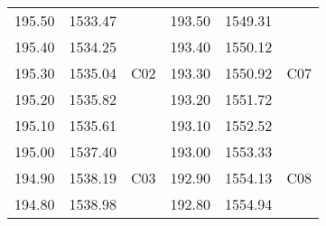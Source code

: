 \documentclass[
	12pt, %
	fleqn, %
	a4paper, %
	oneside, %
]{LegrandOrangeBook}
\begin{document}
\begin{table}[H]
{\begin{tabular}{|ccc|ccc|}
\multicolumn{1}{|c|}{195.50}                                   & \multicolumn{1}{c|}{1533.47}                                 &                       & \multicolumn{1}{c|}{193.50}                                   & \multicolumn{1}{c|}{1549.31}                                 &                       \\ \cline{1-2} \cline{4-5}
\multicolumn{1}{|c|}{195.40}                                   & \multicolumn{1}{c|}{1534.25}                                 &                       & \multicolumn{1}{c|}{193.40}                                   & \multicolumn{1}{c|}{1550.12}                                 &                       \\ \cline{1-2} \cline{4-5}
\multicolumn{1}{|c|}{195.30}                                   & \multicolumn{1}{c|}{1535.04}                                 & \multirow{-4}{*}{C02} & \multicolumn{1}{c|}{193.30}                                   & \multicolumn{1}{c|}{1550.92}                                 & \multirow{-4}{*}{C07} \\ \hline
\multicolumn{1}{|c|}{195.20}                                   & \multicolumn{1}{c|}{1535.82}                                 &                       & \multicolumn{1}{c|}{193.20}                                   & \multicolumn{1}{c|}{1551.72}                                 &                       \\ \cline{1-2} \cline{4-5}
\multicolumn{1}{|c|}{195.10}                                   & \multicolumn{1}{c|}{1535.61}                                 &                       & \multicolumn{1}{c|}{193.10}                                   & \multicolumn{1}{c|}{1552.52}                                 &                       \\ \cline{1-2} \cline{4-5}
\multicolumn{1}{|c|}{195.00}                                   & \multicolumn{1}{c|}{1537.40}                                 &                       & \multicolumn{1}{c|}{193.00}                                   & \multicolumn{1}{c|}{1553.33}                                 &                       \\ \cline{1-2} \cline{4-5}
\multicolumn{1}{|c|}{194.90}                                   & \multicolumn{1}{c|}{1538.19}                                 & \multirow{-4}{*}{C03} & \multicolumn{1}{c|}{192.90}                                   & \multicolumn{1}{c|}{1554.13}                                 & \multirow{-4}{*}{C08} \\ \hline
\multicolumn{1}{|c|}{194.80}                                   & \multicolumn{1}{c|}{1538.98}                                 &                       & \multicolumn{1}{c|}{192.80}                                   & \multicolumn{1}{c|}{1554.94}                                 &                       \\ \cline{1-2} \cline{4-5}

\end{tabular}}
\end{table}
\end{document}
